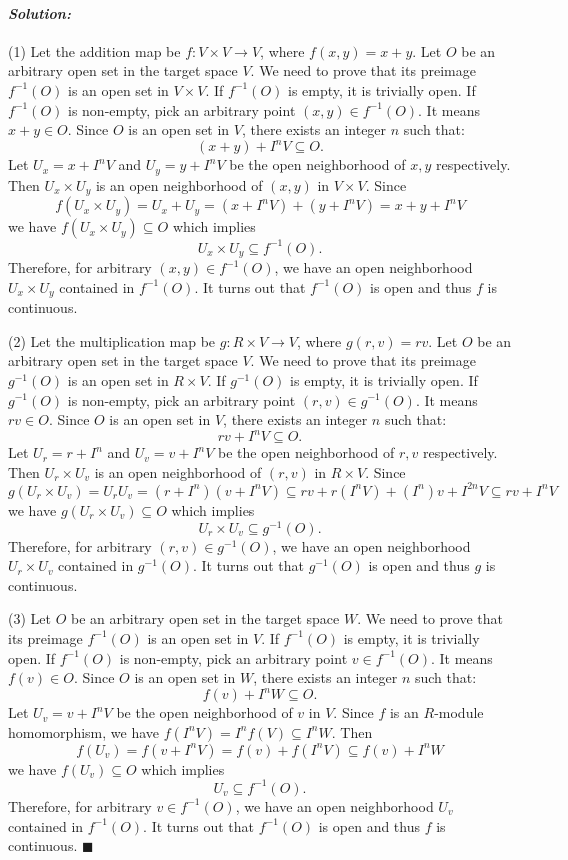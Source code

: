 \documentclass[12pt, a4paper]{article}
\theoremstyle{remark}
\newenvironment{solution}
  {\paragraph{\textit{Solution:}}\par\medskip}
  {\hfill$\blacksquare$\vspace{0.1cm}}
\begin{document}
\begin{solution}
    (1) Let the addition map be $f: V \times V \to V$, where $f(x, y) = x + y$.
    Let $O$ be an arbitrary open set in the target space $V$.
    We need to prove that its preimage $f^{-1}(O)$ is an open set in $V \times V$.
    If $f^{-1}(O)$ is empty, it is trivially open.
    If $f^{-1}(O)$ is non-empty, pick an arbitrary point $(x, y) \in f^{-1}(O)$.
    It means $x + y \in O$.
    Since $O$ is an open set in $V$, there exists an integer $n$ such that:$$(x + y) + I^n V \subseteq O.$$
    Let $U_x = x + I^n V$ and $U_y = y + I^n V$ be the open neighborhood of $x,y$ respectively. Then $U_x \times U_y$ is an open neighborhood of $(x, y)$ in $V \times V$.
    Since $$f(U_x \times U_y) = U_x + U_y = (x + I^n V) + (y + I^n V) = x + y + I^n V$$
    we have $f(U_x \times U_y) \subseteq O$ which implies $$U_x \times U_y \subseteq f^{-1}(O).$$
    Therefore, for arbitrary $(x,y)\in f^{-1}(O)$, we have an open neighborhood $U_x\times U_y$ contained in $f^{-1}(O)$. It turns out that $f^{-1}(O)$ is open and thus $f$ is continuous. 

    (2) Let the multiplication map be $g : R \times V \to V$, where $g(r,v) = rv$. Let $O$ be an arbitrary open set in the target space $V$. We need to prove that its preimage $g^{-1}(O)$ is an open set in $R \times V$. If $g^{-1}(O)$ is empty, it is trivially open. If $g^{-1}(O)$ is non-empty, pick an arbitrary point $(r,v) \in g^{-1}(O)$. It means $rv \in O$. Since $O$ is an open set in $V$, there exists an integer $n$ such that:$$rv + I^n V \subseteq O.$$Let $U_r = r + I^n$ and $U_v = v + I^n V$ be the open neighborhood of $r, v$ respectively. Then $U_r \times U_v$ is an open neighborhood of $(r,v)$ in $R \times V$. Since$$g(U_r \times U_v) = U_r U_v = (r + I^n)(v + I^n V) \subseteq rv + r(I^n V) + (I^n)v + I^{2n}V \subseteq rv + I^n V$$we have $g(U_r \times U_v) \subseteq O$ which implies$$U_r \times U_v \subseteq g^{-1}(O).$$Therefore, for arbitrary $(r,v) \in g^{-1}(O)$, we have an open neighborhood $U_r \times U_v$ contained in $g^{-1}(O)$. It turns out that $g^{-1}(O)$ is open and thus $g$ is continuous.

    (3) Let $O$ be an arbitrary open set in the target space $W$. We need to prove that its preimage $f^{-1}(O)$ is an open set in $V$. If $f^{-1}(O)$ is empty, it is trivially open. If $f^{-1}(O)$ is non-empty, pick an arbitrary point $v \in f^{-1}(O)$. It means $f(v) \in O$. Since $O$ is an open set in $W$, there exists an integer $n$ such that:$$f(v) + I^n W \subseteq O.$$Let $U_v = v + I^n V$ be the open neighborhood of $v$ in $V$. Since $f$ is an $R$-module homomorphism, we have $f(I^n V) = I^n f(V) \subseteq I^n W$. Then$$f(U_v) = f(v + I^n V) = f(v) + f(I^n V) \subseteq f(v) + I^n W$$we have $f(U_v) \subseteq O$ which implies$$U_v \subseteq f^{-1}(O).$$Therefore, for arbitrary $v \in f^{-1}(O)$, we have an open neighborhood $U_v$ contained in $f^{-1}(O)$. It turns out that $f^{-1}(O)$ is open and thus $f$ is continuous.
\end{solution}
\end{document}
